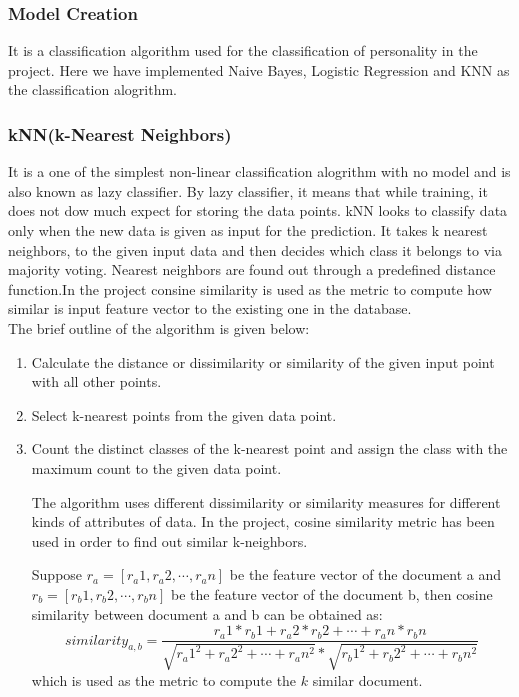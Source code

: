 \subsubsection{Model Creation}
It is a classification algorithm used for the classification of personality in the project. Here we have implemented Naive Bayes, Logistic Regression and KNN as the classification alogrithm.
\subsubsection{ kNN(k-Nearest Neighbors)}
It is a one of the simplest non-linear classification alogrithm with no model and is also known as lazy classifier. By lazy classifier, it means that while training, it does not dow much expect for storing the data points. kNN looks to classify data only when the new data is given as input for the prediction. It takes k nearest neighbors, to the given input data and then decides which class it belongs to via majority voting. Nearest neighbors are found out through a predefined distance function.In the project consine similarity is used as the metric to compute how similar is input feature vector to the existing one in the database.\\

The brief outline of the algorithm is given below:
\begin{enumerate}
	\item Calculate the distance or dissimilarity or similarity of the given input point with all other points.
	\item Select k-nearest points from the given data point.
	\item Count the distinct classes of the k-nearest point and assign the class with the maximum count to the given data point.

	The algorithm uses different dissimilarity or similarity measures for different kinds of attributes of data. In the project, cosine similarity metric has been used in order to find out similar k-neighbors.

Suppose $r_a = [r_a1,r_a2,\cdots,r_an]$ be the feature vector of the document a and  $r_b = [r_b1,r_b2,\cdots,r_bn]$ be the feature vector of the document b, then cosine similarity between document a and b can be obtained as:
\begin{equation}
	similarity_{a,b} = \frac{r_a1*r_b1 + r_a2*r_b2 +\cdots+ r_an*r_bn}{\sqrt{{r_a1}^2+{r_a2}^2+\cdots+{r_an}^2} * \sqrt{{r_b1}^2+{r_b2}^2+\cdots+{r_bn}^2} }  
\end{equation}
which is used as the metric to compute the $k$ similar document.
\end{enumerate}
